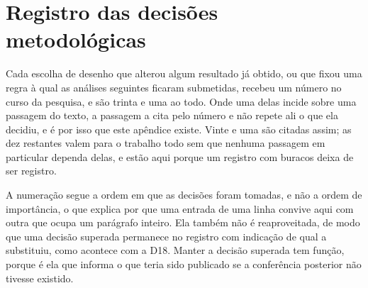 %
%
%
\chapter{Registro das decisões metodológicas}
\label{ap:decisoes}

Cada escolha de desenho que alterou algum resultado já obtido, ou que fixou
uma regra à qual as análises seguintes ficaram submetidas, recebeu um número
no curso da pesquisa, e são trinta e uma ao todo. Onde uma delas incide sobre
uma passagem do texto, a passagem a cita pelo número e não repete ali o que
ela decidiu, e é por isso que este apêndice existe. Vinte e uma são citadas assim;
as dez restantes valem para o trabalho todo sem que nenhuma passagem em
particular dependa delas, e estão aqui porque um registro com buracos deixa de
ser registro.

A numeração segue a ordem em que as decisões foram tomadas, e não a ordem de
importância, o que explica por que uma entrada de uma linha convive aqui com
outra que ocupa um parágrafo inteiro. Ela também não é reaproveitada, de modo
que uma decisão superada permanece no registro com indicação de qual a
substituiu, como acontece com a D18. Manter a decisão superada tem função,
porque é ela que informa o que teria sido publicado se a conferência posterior
não tivesse existido.

